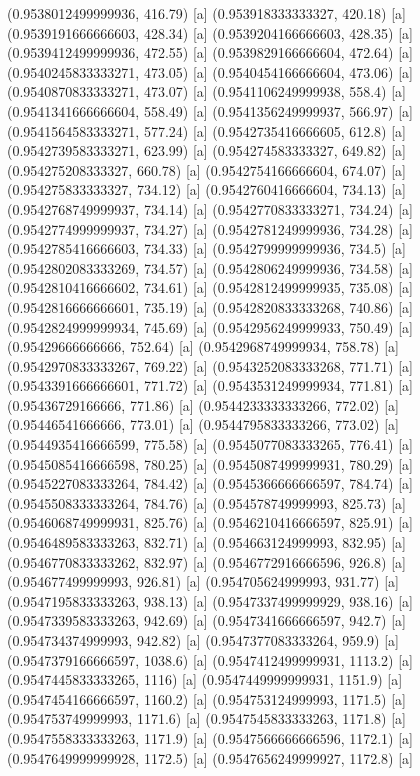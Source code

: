 {{{(0.9538012499999936, 416.79) [a] 
(0.953918333333327, 420.18) [a] 
(0.9539191666666603, 428.34) [a] 
(0.9539204166666603, 428.35) [a] 
(0.9539412499999936, 472.55) [a] 
(0.9539829166666604, 472.64) [a] 
(0.9540245833333271, 473.05) [a] 
(0.9540454166666604, 473.06) [a] 
(0.9540870833333271, 473.07) [a] 
(0.9541106249999938, 558.4) [a] 
(0.9541341666666604, 558.49) [a] 
(0.9541356249999937, 566.97) [a] 
(0.9541564583333271, 577.24) [a] 
(0.9542735416666605, 612.8) [a] 
(0.9542739583333271, 623.99) [a] 
(0.954274583333327, 649.82) [a] 
(0.954275208333327, 660.78) [a] 
(0.9542754166666604, 674.07) [a] 
(0.954275833333327, 734.12) [a] 
(0.9542760416666604, 734.13) [a] 
(0.9542768749999937, 734.14) [a] 
(0.9542770833333271, 734.24) [a] 
(0.9542774999999937, 734.27) [a] 
(0.9542781249999936, 734.28) [a] 
(0.9542785416666603, 734.33) [a] 
(0.9542799999999936, 734.5) [a] 
(0.9542802083333269, 734.57) [a] 
(0.9542806249999936, 734.58) [a] 
(0.9542810416666602, 734.61) [a] 
(0.9542812499999935, 735.08) [a] 
(0.9542816666666601, 735.19) [a] 
(0.9542820833333268, 740.86) [a] 
(0.9542824999999934, 745.69) [a] 
(0.9542956249999933, 750.49) [a] 
(0.95429666666666, 752.64) [a] 
(0.9542968749999934, 758.78) [a] 
(0.9542970833333267, 769.22) [a] 
(0.9543252083333268, 771.71) [a] 
(0.9543391666666601, 771.72) [a] 
(0.9543531249999934, 771.81) [a] 
(0.95436729166666, 771.86) [a] 
(0.9544233333333266, 772.02) [a] 
(0.95446541666666, 773.01) [a] 
(0.9544795833333266, 773.02) [a] 
(0.9544935416666599, 775.58) [a] 
(0.9545077083333265, 776.41) [a] 
(0.9545085416666598, 780.25) [a] 
(0.9545087499999931, 780.29) [a] 
(0.9545227083333264, 784.42) [a] 
(0.9545366666666597, 784.74) [a] 
(0.9545508333333264, 784.76) [a] 
(0.954578749999993, 825.73) [a] 
(0.9546068749999931, 825.76) [a] 
(0.9546210416666597, 825.91) [a] 
(0.9546489583333263, 832.71) [a] 
(0.954663124999993, 832.95) [a] 
(0.9546770833333262, 832.97) [a] 
(0.9546772916666596, 926.8) [a] 
(0.954677499999993, 926.81) [a] 
(0.954705624999993, 931.77) [a] 
(0.9547195833333263, 938.13) [a] 
(0.9547337499999929, 938.16) [a] 
(0.9547339583333263, 942.69) [a] 
(0.9547341666666597, 942.7) [a] 
(0.954734374999993, 942.82) [a] 
(0.9547377083333264, 959.9) [a] 
(0.9547379166666597, 1038.6) [a] 
(0.9547412499999931, 1113.2) [a] 
(0.9547445833333265, 1116) [a] 
(0.9547449999999931, 1151.9) [a] 
(0.9547454166666597, 1160.2) [a] 
(0.954753124999993, 1171.5) [a] 
(0.954753749999993, 1171.6) [a] 
(0.9547545833333263, 1171.8) [a] 
(0.9547558333333263, 1171.9) [a] 
(0.9547566666666596, 1172.1) [a] 
(0.9547649999999928, 1172.5) [a] 
(0.9547656249999927, 1172.8) [a] 
}}}
